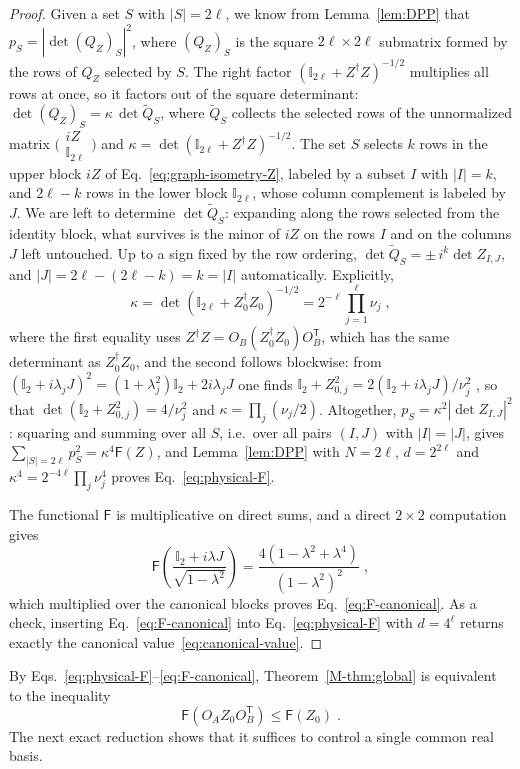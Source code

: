 \documentclass[aps,prl,twocolumn,superscriptaddress,reprint,longbibliography,nofootinbib]{revtex4-2}
\newcommand{\trans}{\mathsf{T}}
\begin{document}
\begin{proof}
Given a set $S$ with $|S|=2\ell$, we know from Lemma~\ref{lem:DPP} that $p_S=|\det(Q_Z)_S|^2$, where $(Q_Z)_S$ is the square $2\ell\times2\ell$ submatrix formed by the rows of $Q_Z$ selected by $S$. The right factor $(\mathbb{I}_{2\ell}+Z^\dagger Z)^{-1/2}$ multiplies all rows at once, so it factors out of the square determinant: $\det(Q_Z)_S=\kappa\,\det\widetilde{Q}_S$, where $\widetilde{Q}_S$ collects the selected rows of the unnormalized matrix $\big(\begin{smallmatrix}iZ\\ \mathbb{I}_{2\ell}\end{smallmatrix}\big)$ and $\kappa=\det(\mathbb{I}_{2\ell}+Z^\dagger Z)^{-1/2}$. 
The set $S$ selects $k$ rows in the upper block $iZ$ of Eq.~\eqref{eq:graph-isometry-Z}, labeled by a subset $I$ with $|I|=k$, and $2\ell-k$ rows in the lower block $\mathbb{I}_{2\ell}$, whose column complement is labeled by $J$.
We are left to determine $\det\widetilde{Q}_S$: expanding along the rows selected from the identity block, what survives is the minor of $iZ$ on the rows $I$ and on the columns $J$ left untouched. Up to a sign fixed by the row ordering, $\det\widetilde{Q}_S=\pm\,i^k\det Z_{I,J}$, and $|J|=2\ell-(2\ell-k)=k=|I|$ automatically. Explicitly,
\begin{equation}
    \kappa=\det\!\left(\mathbb{I}_{2\ell}+Z_0^\dagger Z_0\right)^{-1/2}=2^{-\ell}\prod_{j=1}^{\ell}\nu_j\;,
    \label{eq:kappa}
\end{equation}
where the first equality uses $Z^\dagger Z=O_B(Z_0^\dagger Z_0)O_B^{\trans}$, which has the same determinant as $Z_0^\dagger Z_0$, and the second follows blockwise: from $(\mathbb{I}_2+i\lambda_jJ)^2=(1+\lambda_j^2)\mathbb{I}_2+2i\lambda_jJ$ one finds $\mathbb{I}_2+Z_{0,j}^2=2(\mathbb{I}_2+i\lambda_jJ)/\nu_j^2$ , so that $\det(\mathbb{I}_2+Z_{0,j}^2)=4/\nu_j^2$ and $\kappa=\prod_{j}(\nu_j/2)$. Altogether, $p_S=\kappa^2|\det Z_{I,J}|^2$: squaring and summing over all $S$, i.e.\ over all pairs $(I,J)$ with $|I|=|J|$, gives $\sum_{|S|=2\ell}p_S^2=\kappa^4\mathsf{F}(Z)$, and Lemma~\ref{lem:DPP} with $N=2\ell$, $d=2^{2\ell}$ and $\kappa^4=2^{-4\ell}\prod_j\nu_j^4$ proves Eq.~\eqref{eq:physical-F}.

The functional $\mathsf{F}$ is multiplicative on direct sums, and a direct $2\times2$ computation gives
\begin{equation}
    \mathsf{F}\!\left(\frac{\mathbb{I}_2+i\lambda J}{\sqrt{1-\lambda^2}}\right)=\frac{4\left(1-\lambda^2+\lambda^4\right)}{(1-\lambda^2)^2}\;,
    \label{eq:F_Z_0}
\end{equation}
which multiplied over the canonical blocks proves Eq.~\eqref{eq:F-canonical}. As a check, inserting Eq.~\eqref{eq:F-canonical} into Eq.~\eqref{eq:physical-F} with $d=4^{\ell}$ returns exactly the canonical value~\eqref{eq:canonical-value}.
\end{proof}
By Eqs.~\eqref{eq:physical-F}--\eqref{eq:F-canonical}, Theorem~\ref{M-thm:global} is equivalent to the inequality
\begin{equation}
    \mathsf{F}(O_AZ_0O_B^{\trans})\le \mathsf{F}(Z_0)\;.
    \label{eq:Cartan-target}
\end{equation}
The next exact reduction shows that it suffices to control a single common real basis.
\end{document}
